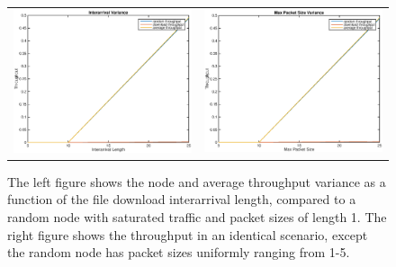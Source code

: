 \begin{figure}
\begin{center}
\begin{tabular}{cc}

\includegraphics[scale=0.35]{../../src/fig-simulation_random_download-interarival-1_0_5_0_1_1_25.eps} & \includegraphics[scale=0.35]{../../src/fig-simulation_random_download-maxpackets-1_0_5_0_1_1_25.eps} \\
\end{tabular}
\caption{The left figure shows the node and average throughput variance as a function of the file download interarrival length, compared to a random node with saturated traffic and packet sizes of length 1. The right figure shows the throughput in an identical scenario, except the random node has packet sizes uniformly ranging from 1-5.}
\label{fig:randomstuff2}
\end{center}
\end{figure}

